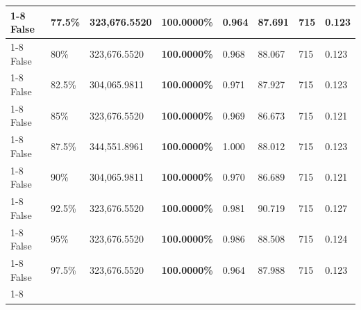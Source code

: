 \begin{table}[H]
\begin{tabular}{lllrllll}
\cline{1-8} \cline{2-8}
False & 77.5\% & 323,676.5520 & \bfseries \color{red} 100.0000\% & 0.964 & 87.691 & 715 & 0.123 \\
\cline{1-8} \cline{2-8}
False & 80\% & 323,676.5520 & \bfseries \color{red} 100.0000\% & 0.968 & 88.067 & 715 & 0.123 \\
\cline{1-8} \cline{2-8}
False & 82.5\% & \color{red} 304,065.9811 & \bfseries \color{red} 100.0000\% & 0.971 & 87.927 & 715 & 0.123 \\
\cline{1-8} \cline{2-8}
False & 85\% & 323,676.5520 & \bfseries \color{red} 100.0000\% & 0.969 & 86.673 & 715 & 0.121 \\
\cline{1-8} \cline{2-8}
False & 87.5\% & 344,551.8961 & \bfseries \color{red} 100.0000\% & 1.000 & 88.012 & 715 & 0.123 \\
\cline{1-8} \cline{2-8}
False & 90\% & \color{red} 304,065.9811 & \bfseries \color{red} 100.0000\% & 0.970 & 86.689 & 715 & 0.121 \\
\cline{1-8} \cline{2-8}
False & 92.5\% & 323,676.5520 & \bfseries \color{red} 100.0000\% & 0.981 & 90.719 & 715 & 0.127 \\
\cline{1-8} \cline{2-8}
False & 95\% & 323,676.5520 & \bfseries \color{red} 100.0000\% & 0.986 & 88.508 & 715 & 0.124 \\
\cline{1-8} \cline{2-8}
False & 97.5\% & 323,676.5520 & \bfseries \color{red} 100.0000\% & 0.964 & 87.988 & 715 & 0.123 \\
\cline{1-8} \cline{2-8}
\bottomrule
\end{tabular}
\end{table}
